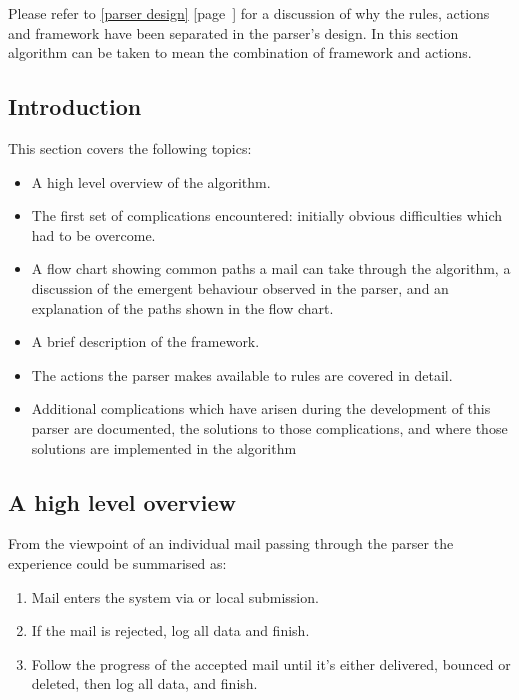 \documentclass[a4paper,12pt,draft]{article}
\newcommand{\refwithpage}[1]{%
    \empty{}\ref{#1} [page~\pageref{#1}]%
}
\newcommand{\sectionref}[1]{%
    \textsection{}\refwithpage{#1}%
}
\begin{document}
Please refer to \sectionref{parser design} for a discussion of why the
rules, actions and framework have been separated in the parser's design.
In this section algorithm can be taken to mean the combination of framework
and actions.

\subsection{Introduction}

This section covers the following topics:

\begin{itemize}

    \item A high level overview of the algorithm.

    \item The first set of complications encountered: initially obvious
        difficulties which had to be overcome.

    \item A flow chart showing common paths a mail can take through the
        algorithm, a discussion of the emergent behaviour observed in the
        parser, and an explanation of the paths shown in the flow chart.

    \item A brief description of the framework.

    \item The actions the parser makes available to rules are covered in
        detail.

    \item Additional complications which have arisen during the development
        of this parser are documented, the solutions to those
        complications, and where those solutions are implemented in the
        algorithm

\end{itemize}

\subsection{A high level overview}

From the viewpoint of an individual mail passing through the parser the
experience could be summarised as:

\begin{enumerate}

    \item Mail enters the system via \SMTP{} or local submission.

    \item If the mail is rejected, log all data and finish.

    \item Follow the progress of the accepted mail until it's either
        delivered, bounced or deleted, then log all data, and finish.

\end{enumerate}
\end{document}
